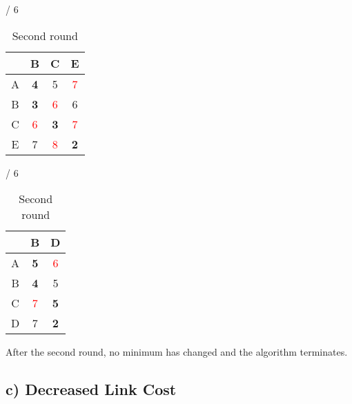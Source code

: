 \documentclass[a4paper, 11 pt, article, accentcolor=tud7b]{tudreport}
\begin{document}
\begin{table}[h]
    \hfill
	  \begin{subtable}[b]{\textwidth / 6}
	    \begin{tabular}{| c | c | c | c |}
	    \hline
	      & B                   & C                  & E                  \\ \hline
	    A & \textbf{4}          & 5                  & \textcolor{red}{7} \\ \hline
	    B & \textbf{3}          & \textcolor{red}{6} & 6                  \\ \hline
	    C & \textcolor{red}{6}  & \textbf{3}         & \textcolor{red}{7} \\ \hline
	    E & 7                   & \textcolor{red}{8} & \textbf{2}         \\ \hline
	    \end{tabular}
	    \caption{$D^{D}$}
	  \end{subtable}
	  \hfill
	  \begin{subtable}[b]{\textwidth / 6}
	    \begin{tabular}{| c | c | c |}
	    \hline
	      & B                   & D                    \\ \hline
	    A & \textbf{5}          & \textcolor{red}{6}           \\ \hline
	    B & \textbf{4}          & 5                    \\ \hline
	    C & \textcolor{red}{7}          & \textbf{5}           \\ \hline
	    D & 7                   & \textbf{2}           \\ \hline
	    \end{tabular}
	    \caption{$D^{E}$}
	  \end{subtable}
	  \caption{Second round}
	\end{table}
	
	After the second round, no minimum has changed and the algorithm terminates.
	
	\newpage
	
	\subsection*{c) Decreased Link Cost}
	
\end{document}
